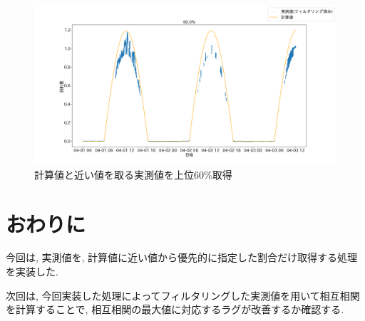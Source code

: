 \documentclass[a4j,12pt,]{jarticle}
\begin{document}
\begin{figure}[H]
  \begin{center}
    \includegraphics[width=160mm]{60.png}
    \caption{計算値と近い値を取る実測値を上位60\%取得}
    \label{p5}
  \end{center}
\end{figure}

\section{おわりに}
今回は, 実測値を, 計算値に近い値から優先的に指定した割合だけ取得する処理を実装した.

次回は, 今回実装した処理によってフィルタリングした実測値を用いて相互相関を計算することで, 相互相関の最大値に対応するラグが改善するか確認する.
\end{document}
